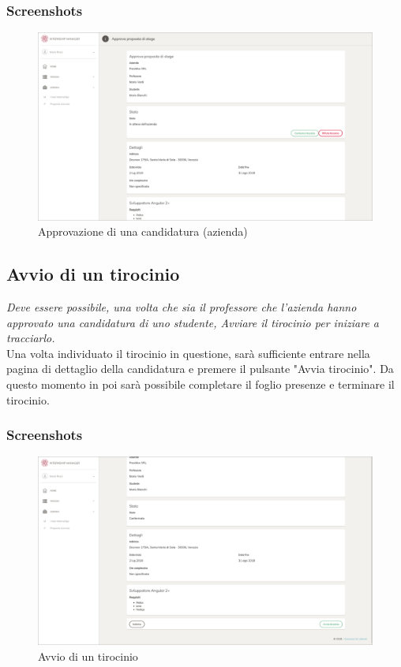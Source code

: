 \subsubsection{Screenshots}
\begin{figure}[H]
	\centering
	\includegraphics[width=1\textwidth]{Figs/screenshots/internshipproposalapprovecompany}     
	\caption[Screenshot: approvazione di una candidatura (azienda)]{Approvazione di una candidatura (azienda)}
	\label{fig:screenshot:6}
\end{figure}

\pagebreak
\subsection{Avvio di un tirocinio}

\textit{Deve essere possibile, una volta che sia il professore che l'azienda hanno approvato una candidatura di uno studente, Avviare il tirocinio per iniziare a tracciarlo.} \\

\noindent
Una volta individuato il tirocinio in questione, sarà sufficiente entrare nella pagina di dettaglio della candidatura e premere il pulsante "Avvia tirocinio". Da questo momento in poi sarà possibile completare il foglio presenze e terminare il tirocinio.

\subsubsection{Screenshots}
\begin{figure}[H]
	\centering
	\includegraphics[width=1\textwidth]{Figs/screenshots/internshipproposalstart}     
	\caption[Screenshot: avvio di un tirocinio]{Avvio di un tirocinio}
	\label{fig:screenshot:7}
\end{figure}

